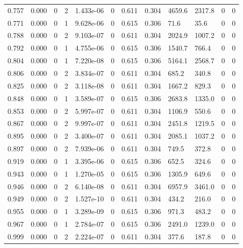 \documentclass[preview]{standalone}
\begin{document}
{{{\begin{tabular}{L{1.2cm}C{1.2cm} C{0.3cm}C{0.5cm} C{1.4cm}C{1.4cm} C{1.4cm}C{1.4cm} C{1.6cm}C{1.6cm} C{1.6cm}C{1.6cm}}
  0.757  &  0.000  & 0     &  2 &  1.433e-06  & 0  &  0.611&   0.304& 4659.6 & 2317.8   &  0 & 0  \\ 
  0.771  &  0.000  & 0     &  1 &  9.628e-06  & 0  &  0.615&   0.306& 71.6 & 35.6   &  0 & 0  \\ 
  0.788  &  0.000  & 0     &  2 &  9.103e-07  & 0  &  0.611&   0.304& 2024.9 & 1007.2   &  0 & 0  \\ 
  0.792  &  0.000  & 0     &  1 &  4.755e-06  & 0  &  0.615&   0.306& 1540.7 & 766.4   &  0 & 0  \\ 
  0.804  &  0.000  & 0     &  1 &  7.220e-08  & 0  &  0.615&   0.306& 5164.1 & 2568.7   &  0 & 0  \\ 
  0.806  &  0.000  & 0     &  2 &  3.834e-07  & 0  &  0.611&   0.304& 685.2 & 340.8   &  0 & 0  \\ 
  0.825  &  0.000  & 0     &  2 &  3.118e-08  & 0  &  0.611&   0.304& 1667.2 & 829.3   &  0 & 0  \\ 
  0.848  &  0.000  & 0     &  1 &  3.589e-07  & 0  &  0.615&   0.306& 2683.8 & 1335.0   &  0 & 0  \\ 
  0.853  &  0.000  & 0     &  2 &  5.997e-07  & 0  &  0.611&   0.304& 1106.9 & 550.6   &  0 & 0  \\ 
  0.867  &  0.000  & 0     &  2 &  9.997e-07  & 0  &  0.611&   0.304& 2451.8 & 1219.5   &  0 & 0  \\ 
  0.895  &  0.000  & 0     &  2 &  3.400e-07  & 0  &  0.611&   0.304& 2085.1 & 1037.2   &  0 & 0  \\ 
  0.897  &  0.000  & 0     &  2 &  7.939e-06  & 0  &  0.611&   0.304& 749.5 & 372.8   &  0 & 0  \\ 
  0.919  &  0.000  & 0     &  1 &  3.395e-06  & 0  &  0.615&   0.306& 652.5 & 324.6   &  0 & 0  \\ 
  0.943  &  0.000  & 0     &  1 &  1.270e-05  & 0  &  0.615&   0.306& 1305.9 & 649.6   &  0 & 0  \\ 
  0.946  &  0.000  & 0     &  2 &  6.140e-08  & 0  &  0.611&   0.304& 6957.9 & 3461.0   &  0 & 0  \\ 
  0.949  &  0.000  & 0     &  2 &  1.527e-10  & 0  &  0.611&   0.304& 434.2 & 216.0   &  0 & 0  \\ 
  0.955  &  0.000  & 0     &  1 &  3.289e-09  & 0  &  0.615&   0.306& 971.3 & 483.2   &  0 & 0  \\ 
  0.967  &  0.000  & 0     &  1 &  2.784e-07  & 0  &  0.615&   0.306& 2491.0 & 1239.0   &  0 & 0  \\ 
  0.999  &  0.000  & 0     &  2 &  2.224e-07  & 0  &  0.611&   0.304& 377.6 & 187.8   &  0 & 0  \\ 

\end{tabular}}}}
\end{document}
